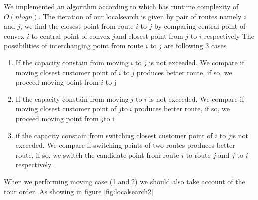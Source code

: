 \documentclass[12pt]{article}
\begin{document}
We implemented an algorithm according to \cite{Berg97} which has runtime complexity of $O(nlogn)$. The iteration of our localsearch is given by pair of routes namely \(i\) and \(j\), we find the closest point from route \(i\) to \(j\) by comparing central point of convex \(i\) to central point of convex \(j\)and closest point from \(j\) to \(i\) respectively The possibilities of interchanging point from route \(i\) to \(j\) are following 3 cases
\begin{enumerate}

	\item If the capacity constain from moving \(i\) to \(j\) is not exceeded. We compare if moving closest customer point of \(i\) to \(j\) produces better route, if so, we proceed moving point from \(i\) to j

	\item If the capacity constain from moving \(j\) to \(i\) is not exceeded. We compare if moving closest customer point of \(j\)to \(i\) produces better route, if so, we proceed moving point from \(j\)to i

	\item if the capacity constain from switching closest customer point of \(i\) to \(j\)is not exceeded. We compare if switching points of two routes produces better route, if so, we switch the candidate point from route \(i\) to route \(j\) and \(j\) to \(i\) respectively.
\end{enumerate}

When we performing moving case (1 and 2) we should also take account of the tour order. As showing in figure \ref{fig:localsearch2}

\begin{figure}[!tbp]
	\centering
	\hfill


\end{figure}
\end{document}
